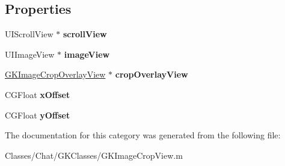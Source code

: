 \subsection*{Properties}
\begin{DoxyCompactItemize}
\item 
\hypertarget{category_g_k_image_crop_view_07_08_a78e32c516cf50db42a9328fb85afdf81}{}U\+I\+Scroll\+View $\ast$ {\bfseries scroll\+View}\label{category_g_k_image_crop_view_07_08_a78e32c516cf50db42a9328fb85afdf81}

\item 
\hypertarget{category_g_k_image_crop_view_07_08_a4ee7d9aa2a6ba96cf40ef5b13e0e9878}{}U\+I\+Image\+View $\ast$ {\bfseries image\+View}\label{category_g_k_image_crop_view_07_08_a4ee7d9aa2a6ba96cf40ef5b13e0e9878}

\item 
\hypertarget{category_g_k_image_crop_view_07_08_a89ca2891627bc1cb1e450121668a3f8a}{}\hyperlink{interface_g_k_image_crop_overlay_view}{G\+K\+Image\+Crop\+Overlay\+View} $\ast$ {\bfseries crop\+Overlay\+View}\label{category_g_k_image_crop_view_07_08_a89ca2891627bc1cb1e450121668a3f8a}

\item 
\hypertarget{category_g_k_image_crop_view_07_08_a77b499130aa207043459610821df6630}{}C\+G\+Float {\bfseries x\+Offset}\label{category_g_k_image_crop_view_07_08_a77b499130aa207043459610821df6630}

\item 
\hypertarget{category_g_k_image_crop_view_07_08_a745c5b31dc371465137a7fcd25c3a414}{}C\+G\+Float {\bfseries y\+Offset}\label{category_g_k_image_crop_view_07_08_a745c5b31dc371465137a7fcd25c3a414}

\end{DoxyCompactItemize}


The documentation for this category was generated from the following file\+:\begin{DoxyCompactItemize}
\item 
Classes/\+Chat/\+G\+K\+Classes/G\+K\+Image\+Crop\+View.\+m\end{DoxyCompactItemize}
